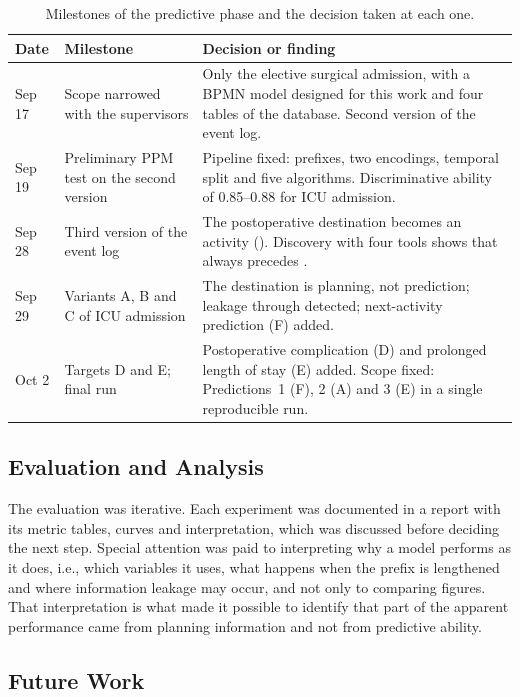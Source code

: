 \begin{table}[htbp]
\centering
\caption{Milestones of the predictive phase and the decision taken at each one.}
\label{tab:cronologia}
\small
\begin{tabular}{L{1.6cm}L{4.6cm}L{7.2cm}}
\toprule
Date & Milestone & Decision or finding \\
\midrule
Sep 17 & Scope narrowed with the supervisors & Only the elective surgical admission, with a BPMN model designed for this work and four tables of the database. Second version of the event log. \\
Sep 19 & Preliminary PPM test on the second version & Pipeline fixed: prefixes, two encodings, temporal split and five algorithms. Discriminative ability of 0.85--0.88 for ICU admission. \\
Sep 28 & Third version of the event log & The postoperative destination becomes an activity (). Discovery with four tools shows that  always precedes . \\
Sep 29 & Variants A, B and C of ICU admission & The destination is planning, not prediction; leakage through  detected; next-activity prediction (F) added. \\
Oct 2 & Targets D and E; final run & Postoperative complication (D) and prolonged length of stay (E) added. Scope fixed: Predictions~1 (F), 2 (A) and 3 (E) in a single reproducible run. \\
\bottomrule
\end{tabular}
\end{table}

\subsection{Evaluation and Analysis}

The evaluation was iterative. Each experiment was documented in a report with its metric tables, curves and interpretation, which was discussed before deciding the next step. Special attention was paid to interpreting why a model performs as it does, i.e., which variables it uses, what happens when the prefix is lengthened and where information leakage may occur, and not only to comparing figures. That interpretation is what made it possible to identify that part of the apparent performance came from planning information and not from predictive ability.

\subsection{Future Work}

